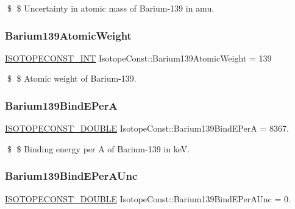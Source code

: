 \$ \$ Uncertainty in atomic mass of Barium-\/139 in amu. \mbox{\label{group___isotope_const-_barium-_ba139_gaf94e7cffcdc2c75fbe44cd070bac7f42}} 
\subsubsection{\texorpdfstring{Barium139\+Atomic\+Weight}{Barium139AtomicWeight}}
{\footnotesize\ttfamily \mbox{\hyperlink{group___isotope_const-_macros_ga5f18360b3e99483a35c32d789e62621c}{I\+S\+O\+T\+O\+P\+E\+C\+O\+N\+S\+T\+\_\+\+I\+NT}} Isotope\+Const\+::\+Barium139\+Atomic\+Weight = 139}

\$ \$ Atomic weight of Barium-\/139. \mbox{\label{group___isotope_const-_barium-_ba139_ga67a1cde49df3acc082f3d4ddd07342aa}} 
\subsubsection{\texorpdfstring{Barium139\+Bind\+E\+PerA}{Barium139BindEPerA}}
{\footnotesize\ttfamily \mbox{\hyperlink{group___isotope_const-_macros_ga8f45a7272ce02c0b4c65c44636ed719a}{I\+S\+O\+T\+O\+P\+E\+C\+O\+N\+S\+T\+\_\+\+D\+O\+U\+B\+LE}} Isotope\+Const\+::\+Barium139\+Bind\+E\+PerA = 8367.}

\$ \$ Binding energy per A of Barium-\/139 in keV. \mbox{\label{group___isotope_const-_barium-_ba139_gaee315dee0105cbf8dfdec757c85c84ba}} 
\subsubsection{\texorpdfstring{Barium139\+Bind\+E\+Per\+A\+Unc}{Barium139BindEPerAUnc}}
{\footnotesize\ttfamily \mbox{\hyperlink{group___isotope_const-_macros_ga8f45a7272ce02c0b4c65c44636ed719a}{I\+S\+O\+T\+O\+P\+E\+C\+O\+N\+S\+T\+\_\+\+D\+O\+U\+B\+LE}} Isotope\+Const\+::\+Barium139\+Bind\+E\+Per\+A\+Unc = 0.}

